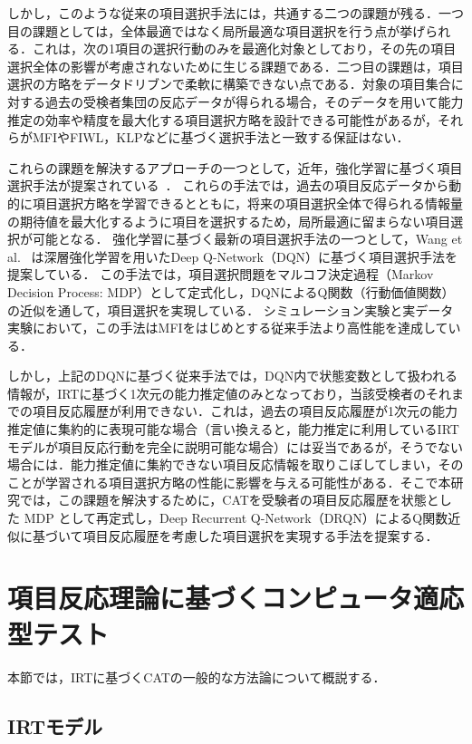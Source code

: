 \documentclass[dvipdfmx,a4j]{jarticle}
\begin{document}
しかし，このような従来の項目選択手法には，共通する二つの課題が残る．一つ目の課題としては，全体最適ではなく局所最適な項目選択を行う点が挙げられる．これは，次の1項目の選択行動のみを最適化対象としており，その先の項目選択全体の影響が考慮されないために生じる課題である．二つ目の課題は，項目選択の方略をデータドリブンで柔軟に構築できない点である．対象の項目集合に対する過去の受検者集団の反応データが得られる場合，そのデータを用いて能力推定の効率や精度を最大化する項目選択方略を設計できる可能性があるが，それらがMFIやFIWL，KLPなどに基づく選択手法と一致する保証はない．

これらの課題を解決するアプローチの一つとして，近年，強化学習に基づく項目選択手法が提案されている~\cite{ghosh2021,nurakhmetov2019,shin2022,wang2024}．
これらの手法では，過去の項目反応データから動的に項目選択方略を学習できるとともに，将来の項目選択全体で得られる情報量の期待値を最大化するように項目を選択するため，局所最適に留まらない項目選択が可能となる．
強化学習に基づく最新の項目選択手法の一つとして，Wang et al.~\cite{wang2024} は深層強化学習を用いたDeep Q-Network（DQN）に基づく項目選択手法を提案している．
この手法では，項目選択問題をマルコフ決定過程（Markov Decision Process: MDP）として定式化し，DQNによるQ関数（行動価値関数）の近似を通して，項目選択を実現している．
シミュレーション実験と実データ実験において，この手法はMFIをはじめとする従来手法より高性能を達成している．

しかし，上記のDQNに基づく従来手法では，DQN内で状態変数として扱われる情報が，IRTに基づく1次元の能力推定値のみとなっており，当該受検者のそれまでの項目反応履歴が利用できない．これは，過去の項目反応履歴が1次元の能力推定値に集約的に表現可能な場合（言い換えると，能力推定に利用しているIRTモデルが項目反応行動を完全に説明可能な場合）には妥当であるが，そうでない場合には．能力推定値に集約できない項目反応情報を取りこぼしてしまい，そのことが学習される項目選択方略の性能に影響を与える可能性がある．そこで本研究では，この課題を解決するために，CATを受験者の項目反応履歴を状態とした MDP として再定式し，Deep Recurrent Q-Network（DRQN）によるQ関数近似に基づいて項目反応履歴を考慮した項目選択を実現する手法を提案する．

\section{項目反応理論に基づくコンピュータ適応型テスト}

本節では，IRTに基づくCATの一般的な方法論について概説する．

\subsection{IRTモデル}
\end{document}
